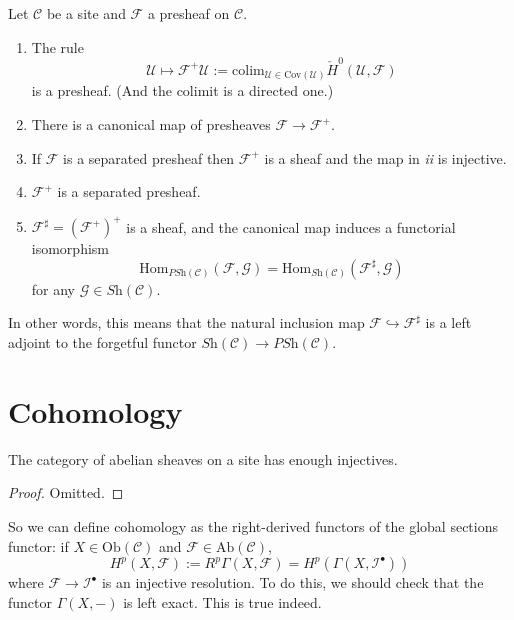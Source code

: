 \begin{theorem}
Let $\mathcal{C}$ be a site and $\mathcal{F}$ a presheaf on $\mathcal{C}$.
\begin{enumerate}
\item The rule
$$
\mathcal{U} \mapsto \mathcal{F}^+ \mathcal{U} := \text{colim}_{\mathcal{U} \in 
\text{Cov}(\mathcal{U})} \check H^0(\mathcal{U}, \mathcal{F})
$$
is a presheaf. (And the colimit is a directed one.)
\item There is a canonical map of presheaves $\mathcal{F} \to \mathcal{F}^+$.
\item If $\mathcal{F}$ is a separated presheaf then $\mathcal{F}^+$ is a sheaf 
and the map in {\it ii} is injective.
\item $\mathcal{F}^+$ is a separated presheaf.
\item $\mathcal{F}^\sharp = (\mathcal{F}^+)^+$ is a sheaf, and the canonical 
map induces a functorial isomorphism
$$ 
\text{Hom}_{\textit{PSh}(\mathcal{C})}(\mathcal{F}, \mathcal{G}) = 
\text{Hom}_{\textit{Sh}(\mathcal{C})}(\mathcal{F}^\sharp,\mathcal{G})
$$ 
for any $\mathcal{G} \in \textit{Sh}(\mathcal{C})$.
\end{enumerate}
\end{theorem}

\noindent
In other words, this means that the natural inclusion map $\mathcal{F} 
\hookrightarrow \mathcal{F}^\sharp$ is a left adjoint to the forgetful functor 
$\textit{Sh}(\mathcal{C}) \to \textit{PSh}(\mathcal{C})$.

\section{Cohomology}
\label{section-cohomology}

\begin{theorem}
The category of abelian sheaves on a site has enough injectives.
\end{theorem}

\begin{proof}
Omitted.
\end{proof}

\noindent
So we can define cohomology as the right-derived functors of the global 
sections functor: if $X \in \text{Ob}(\mathcal{C})$ and $\mathcal{F} \in 
\text{Ab}(\mathcal{C})$, 
$$
H^p(X,\mathcal{F}) := R^p \Gamma (X, \mathcal{F}) = H^p (\Gamma(X, 
\mathcal{I}^\bullet))
$$
where $\mathcal{F} \to \mathcal{I}^\bullet$ is an injective resolution. To do 
this, we should check that the functor $\Gamma (X, -)$ is left exact. This is 
true indeed.

